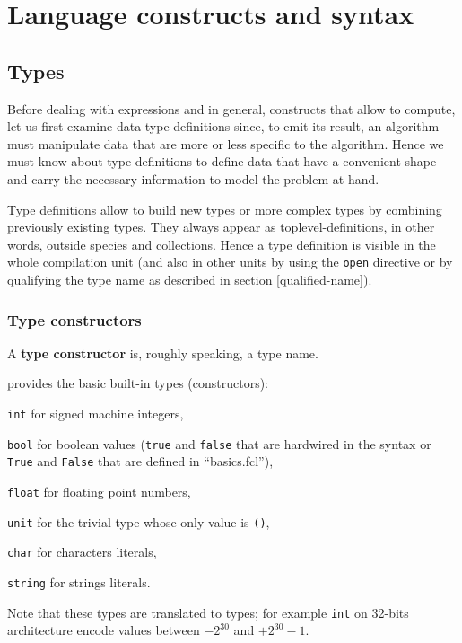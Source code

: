 

\section{Language constructs and syntax}
\subsection{Types}
Before dealing with expressions and in general, constructs that allow to
compute, let us first examine data-type definitions since, to emit its
result, an algorithm must manipulate data that are more or less specific to
the algorithm. Hence we must know about type definitions to define data that
have a convenient shape and carry the necessary information to model the
problem at hand.

Type definitions allow to build new types or more complex types by
combining previously existing types. They always appear as
toplevel-definitions, in other words, outside species and
collections. Hence a type definition is visible in the whole
compilation unit (and also in other units by using the {\tt open}
directive or by qualifying the type name as described in section
\ref{qualified-name}).

\subsubsection{Type constructors}
A {\bf type constructor} is, roughly speaking, a type name.

{\focal} provides the basic built-in
types (constructors):
\begin{compact-itemize}
  \item {\tt int} for signed machine integers,
  \item {\tt bool} for boolean values ({\tt true} and {\tt false} that
    are hardwired in the syntax or {\tt True} and {\tt False} that are
    defined in ``basics.fcl''),
  \item {\tt float} for floating point numbers,
  \item {\tt unit} for the trivial type whose only value is {\tt ()},
  \item {\tt char} for characters literals,
  \item {\tt string} for strings literals.
\end{compact-itemize}
Note that these types are translated to {\ocaml} types; for example
{\tt int} on 32-bits architecture encode values between $-2^{30}$
and $+2^{30}-1$.

